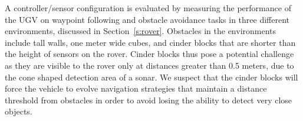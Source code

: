 
A controller/sensor configuration is evaluated by measuring
the performance of the UGV on waypoint following and obstacle avoidance tasks in 
three different environments, discussed in Section~\ref{s:rover}.   
%
Obstacles in the environments include tall walls, one meter wide cubes, and cinder blocks that are shorter than the height of sensors on the rover. 
%
Cinder blocks thus pose a potential challenge as they are
visible to the rover only at distances greater than 0.5 meters,
due to the cone shaped detection area of a sonar.
%
We suspect that the cinder blocks will force the vehicle
to evolve navigation strategies
that maintain a distance threshold from obstacles in order
to avoid losing the ability to detect very close objects.

